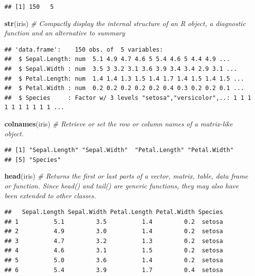 \documentclass[]{article}
\newenvironment{Shaded}{\begin{snugshade}}{\end{snugshade}}
\newcommand{\CommentTok}[1]{\textcolor[rgb]{0.56,0.35,0.01}{\textit{#1}}}
\newcommand{\KeywordTok}[1]{\textcolor[rgb]{0.13,0.29,0.53}{\textbf{#1}}}
\newcommand{\NormalTok}[1]{#1}
\begin{document}
\begin{verbatim}
## [1] 150   5
\end{verbatim}

\begin{Shaded}
\begin{Highlighting}[]
\KeywordTok{str}\NormalTok{(iris) }\CommentTok{# Compactly display the internal structure of an R object, a diagnostic function and an alternative to summary}
\end{Highlighting}
\end{Shaded}

\begin{verbatim}
## 'data.frame':    150 obs. of  5 variables:
##  $ Sepal.Length: num  5.1 4.9 4.7 4.6 5 5.4 4.6 5 4.4 4.9 ...
##  $ Sepal.Width : num  3.5 3 3.2 3.1 3.6 3.9 3.4 3.4 2.9 3.1 ...
##  $ Petal.Length: num  1.4 1.4 1.3 1.5 1.4 1.7 1.4 1.5 1.4 1.5 ...
##  $ Petal.Width : num  0.2 0.2 0.2 0.2 0.2 0.4 0.3 0.2 0.2 0.1 ...
##  $ Species     : Factor w/ 3 levels "setosa","versicolor",..: 1 1 1 1 1 1 1 1 1 1 ...
\end{verbatim}

\begin{Shaded}
\begin{Highlighting}[]
\KeywordTok{colnames}\NormalTok{(iris) }\CommentTok{# Retrieve or set the row or column names of a matrix-like object.}
\end{Highlighting}
\end{Shaded}

\begin{verbatim}
## [1] "Sepal.Length" "Sepal.Width"  "Petal.Length" "Petal.Width" 
## [5] "Species"
\end{verbatim}

\begin{Shaded}
\begin{Highlighting}[]
\KeywordTok{head}\NormalTok{(iris) }\CommentTok{# Returns the first or last parts of a vector, matrix, table, data frame or function. Since head() and tail() are generic functions, they may also have been extended to other classes.}
\end{Highlighting}
\end{Shaded}

\begin{verbatim}
##   Sepal.Length Sepal.Width Petal.Length Petal.Width Species
## 1          5.1         3.5          1.4         0.2  setosa
## 2          4.9         3.0          1.4         0.2  setosa
## 3          4.7         3.2          1.3         0.2  setosa
## 4          4.6         3.1          1.5         0.2  setosa
## 5          5.0         3.6          1.4         0.2  setosa
## 6          5.4         3.9          1.7         0.4  setosa
\end{verbatim}
\end{document}
